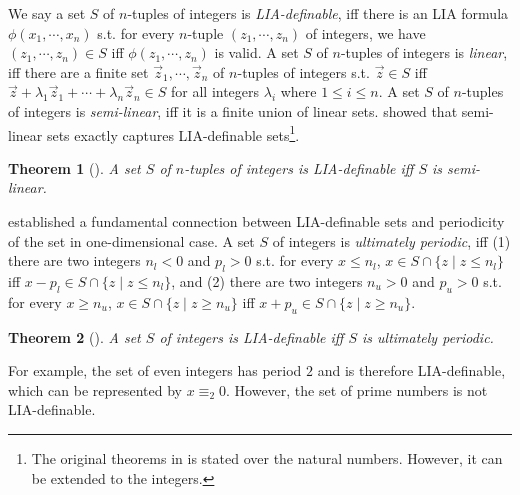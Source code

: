 \documentclass[review]{elsarticle}
\newcommand{\set}[1]{\{ #1 \}}
\newcommand{\modulo}{\equiv}
\newtheorem{theorem}{Theorem}
\begin{document}
	We say a set $S$ of $n$-tuples of integers is \textit{LIA-definable}, iff there is an LIA formula $\phi(x_1, \cdots, x_n)$ s.t. for every $n$-tuple $(z_1, \cdots, z_n)$ of integers, we have $(z_1, \cdots, z_n) \in S$ iff $\phi(z_1, \cdots, z_n)$ is valid.
	A set $S$ of $n$-tuples of integers is \textit{linear}, iff there are a finite set $\vec{z}_1, \cdots, \vec{z}_n$ of $n$-tuples of integers s.t. $\vec{z} \in S$ iff $\vec{z} + \lambda_1 \vec{z}_1 + \cdots + \lambda_n \vec{z}_n \in S$ for all integers $\lambda_i$ where $1 \leq i \leq n$.
	A set $S$ of $n$-tuples of integers is \textit{semi-linear}, iff it is a finite union of linear sets.
	\citet{GinS1966} showed that semi-linear sets exactly captures LIA-definable sets\footnote{The original theorems in \cite{GinS1966,Cob1969} is stated over the natural numbers. However, it can be extended to the integers.}.	
	
	\begin{theorem}[\cite{GinS1966}] \label{thm:semiLin}
		A set $S$ of $n$-tuples of integers is LIA-definable iff $S$ is semi-linear.
	\end{theorem}	
	
	\citet{Cob1969} established a fundamental connection between LIA-definable sets and periodicity of the set in one-dimensional case.	
	A set $S$ of integers is \textit{ultimately periodic}, iff (1) there are two integers $n_l < 0$ and $p_l > 0$ s.t. for every $x \leq n_l$, $x \in S \cap \set{z \mid z \leq n_l}$ iff $x - p_l \in S \cap \set{z \mid z \leq n_l}$, and (2) there are two integers $n_u > 0$ and $p_u > 0$ s.t. for every $x \geq n_u$, $x \in S \cap \set{z \mid z \geq n_u}$ iff $x + p_u \in S \cap \set{z \mid z \geq n_u}$.
	\begin{theorem}[\cite{Cob1969}] \label{thm:ultPeriodic}
		A set $S$ of integers is LIA-definable iff $S$ is ultimately periodic.
	\end{theorem}
	
	For example, the set of even integers has period $2$ and is therefore LIA-definable, which can be represented by $x \modulo_{2} 0$.
	However, the set of prime numbers is not LIA-definable. 
	
\end{document}
